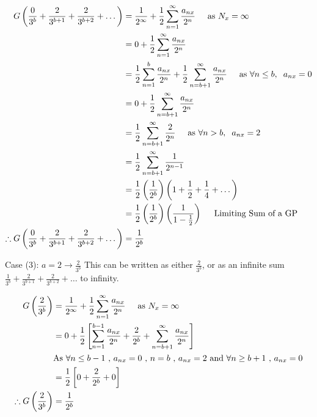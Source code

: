 \documentclass[a4paper]{article}
\begin{document}
\begin{enumerate}[label=\textbf{\arabic*.}]
\begin{enumerate}
		\begin{align*}
		G\left(\frac{0}{3^b} + \frac{2}{3^{b+1}} + \frac{2}{3^{b+2}} + \dots\right) & = \frac{1}{2^\infty} + \frac{1}{2}\sum_{n=1}^{\infty}\frac{a_{nx}}{2^n} \hspace{5mm} \text{as } N_x = \infty\\
		& = 0 + \frac{1}{2}\sum_{n=1}^{\infty}\frac{a_{nx}}{2^n}\\
		& = \frac{1}{2}\sum_{n=1}^{b}\frac{a_{nx}}{2^n} + \frac{1}{2}\sum_{n=b+1}^{\infty}\frac{a_{nx}}{2^n} \hspace{5mm} \text{as } \forall n\leq b, \hspace{2mm} a_{nx} = 0\\
		& = 0 + \frac{1}{2}\sum_{n=b+1}^{\infty}\frac{a_{nx}}{2^n}\\
		& = \frac{1}{2}\sum_{n=b+1}^{\infty}\frac{2}{2^n} \hspace{5mm} \text{as } \forall n > b, \hspace{2mm} a_{nx} = 2\\
		& = \frac{1}{2}\sum_{n=b+1}^{\infty}\frac{1}{2^{n-1}}\\
		& =  \frac{1}{2} \left(\frac{1}{2^b}\right)\left(1 +  \frac{1}{2} +  \frac{1}{4} + \dots \right)\\
		& =  \frac{1}{2} \left(\frac{1}{2^b}\right)\left(\frac{1}{1-\frac{1}{2}} \right) \hspace{5mm} \text{Limiting Sum of a GP} \\
		\therefore G\left(\frac{0}{3^b} + \frac{2}{3^{b+1}} + \frac{2}{3^{b+2}} + \dots\right) & = \frac{1}{2^b}\\
		\end{align*}

		\pagebreak

		Case (3): $\displaystyle{a = 2 \rightarrow \frac{2}{3^b}}$ This can be written as either $\displaystyle{\frac{2}{3^b}}$, or as an infinite sum $\displaystyle{\frac{1}{3^b} + \frac{2}{3^{b+1}} + \frac{2}{3^{b+2}} + \dots}$ to infinity. 

		\begin{align*}
		G\left(\frac{2}{3^b}\right) & = \frac{1}{2^\infty} + \frac{1}{2}\sum_{n=1}^{\infty}\frac{a_{nx}}{2^n} \hspace{5mm} \text{as } N_x = \infty\\
		& = 0 + \frac{1}{2}\left[\sum_{n=1}^{b-1}\frac{a_{nx}}{2^n} + \frac{2}{2^b} + \sum_{n=b+1}^{\infty}\frac{a_{nx}}{2^n}\right]\\
		& \text{As } \forall n\leq b-1 \text{ , } a_{nx} = 0 \text{ , } n=b \text{ , } a_{nx} = 2 \text{ and } \forall n \geq b+1 \text{ , } a_{nx} = 0\\
		& = \frac{1}{2}\left[0 + \frac{2}{2^b} + 0\right]\\
		\therefore G\left(\frac{2}{3^b}\right) & = \frac{1}{2^b}\\
		\end{align*}


\end{enumerate}
\end{enumerate}
\end{document}

